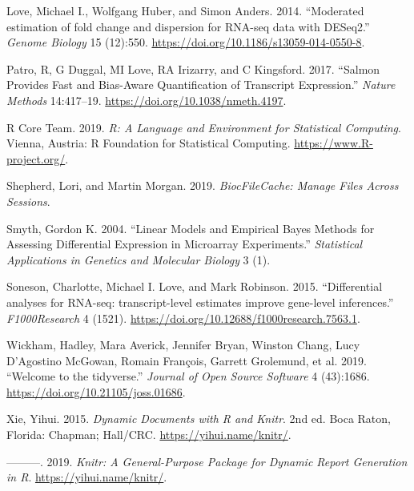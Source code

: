 \documentclass[
]{article}
\begin{document}
\leavevmode\hypertarget{ref-Love2014}{}%
Love, Michael I., Wolfgang Huber, and Simon Anders. 2014. ``Moderated estimation of fold change and dispersion for RNA-seq data with DESeq2.'' \emph{Genome Biology} 15 (12):550. \url{https://doi.org/10.1186/s13059-014-0550-8}.

\leavevmode\hypertarget{ref-salmon}{}%
Patro, R, G Duggal, MI Love, RA Irizarry, and C Kingsford. 2017. ``Salmon Provides Fast and Bias-Aware Quantification of Transcript Expression.'' \emph{Nature Methods} 14:417--19. \url{https://doi.org/10.1038/nmeth.4197}.

\leavevmode\hypertarget{ref-baser}{}%
R Core Team. 2019. \emph{R: A Language and Environment for Statistical Computing}. Vienna, Austria: R Foundation for Statistical Computing. \url{https://www.R-project.org/}.

\leavevmode\hypertarget{ref-bcfilecache}{}%
Shepherd, Lori, and Martin Morgan. 2019. \emph{BiocFileCache: Manage Files Across Sessions}.

\leavevmode\hypertarget{ref-Smyth2004}{}%
Smyth, Gordon K. 2004. ``Linear Models and Empirical Bayes Methods for Assessing Differential Expression in Microarray Experiments.'' \emph{Statistical Applications in Genetics and Molecular Biology} 3 (1).

\leavevmode\hypertarget{ref-Soneson2015}{}%
Soneson, Charlotte, Michael I. Love, and Mark Robinson. 2015. ``Differential analyses for RNA-seq: transcript-level estimates improve gene-level inferences.'' \emph{F1000Research} 4 (1521). \url{https://doi.org/10.12688/f1000research.7563.1}.

\leavevmode\hypertarget{ref-tidyverse}{}%
Wickham, Hadley, Mara Averick, Jennifer Bryan, Winston Chang, Lucy D'Agostino McGowan, Romain François, Garrett Grolemund, et al. 2019. ``Welcome to the tidyverse.'' \emph{Journal of Open Source Software} 4 (43):1686. \url{https://doi.org/10.21105/joss.01686}.

\leavevmode\hypertarget{ref-xie2015}{}%
Xie, Yihui. 2015. \emph{Dynamic Documents with R and Knitr}. 2nd ed. Boca Raton, Florida: Chapman; Hall/CRC. \url{https://yihui.name/knitr/}.

\leavevmode\hypertarget{ref-knitr}{}%
---------. 2019. \emph{Knitr: A General-Purpose Package for Dynamic Report Generation in R}. \url{https://yihui.name/knitr/}.
\end{document}

